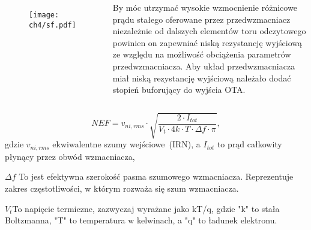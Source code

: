 \begin{frame}[t]
    \begin{block}{\dk}
    \end{block}

    \begin{columns}

        \begin{figure}[H]
            \texttt{[image: ch4/sf.pdf]}
        \end{figure}


        By móc utrzymać wysokie wzmocnienie różnicowe prądu stałego oferowane przez przedwzmacniacz niezależnie od dalszych elementów toru odczytowego powinien on zapewniać niską rezystancję wyjściową ze względu na możliwość obciążenia parametrów przedwzmacniacza.
        Aby układ przedwzmacniacza miał niską rezystancję wyjściową należało dodać stopień buforujący do wyjścia OTA.
    \end{columns} 

\end{frame}


\begin{frame}[t]
    \begin{block}{\dk}
    \end{block}
    \begin{equation}
        NEF = v_{ni,rms}\cdot\sqrt{\frac{2\cdot I_{tot}}{V_t\cdot 4k\cdot T \cdot \Delta f \cdot \pi}},
        \label{equ:NEF}
    \end{equation}
    gdzie $v_{ni,rms}$ ekwiwalentne szumy wejściowe~(IRN), a $I_{tot}$ to prąd całkowity płynący przez obwód wzmacniacza, 
    
 
    $\Delta f$ To jest efektywna szerokość pasma szumowego wzmacniacza. Reprezentuje zakres częstotliwości, w którym rozważa się szum wzmacniacza.

    $V_t$To napięcie termiczne, zazwyczaj wyrażane jako kT/q, gdzie "k" to stała Boltzmanna, "T" to temperatura w kelwinach, a "q" to ładunek elektronu.


\end{frame}



